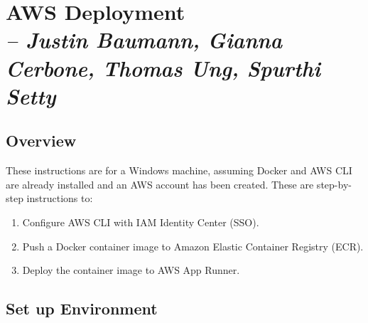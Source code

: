 \chapter{AWS Deployment \\
\small{\textit{-- Justin Baumann, Gianna Cerbone, Thomas Ung, Spurthi Setty}} 
\label{Chapter::AWS Development}}

\section{Overview}
These instructions are for a Windows machine, assuming Docker and AWS CLI are already installed and an AWS account has been created. These are step-by-step instructions to:
\begin{enumerate}
  \item Configure AWS CLI with IAM Identity Center (SSO).
  \item Push a Docker container image to Amazon Elastic Container Registry (ECR).
  \item Deploy the container image to AWS App Runner.
\end{enumerate}

\section{Set up Environment}

